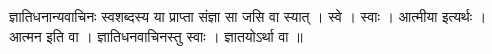 ज्ञातिधनान्यवाचिनः स्वशब्दस्य या प्राप्ता संज्ञा सा जसि वा स्यात् । स्वे
। स्वाः । आत्मीया इत्यर्थः । आत्मन इति वा । ज्ञातिधनवाचिनस्तु स्वाः ।
ज्ञातयोऽर्था वा ॥
